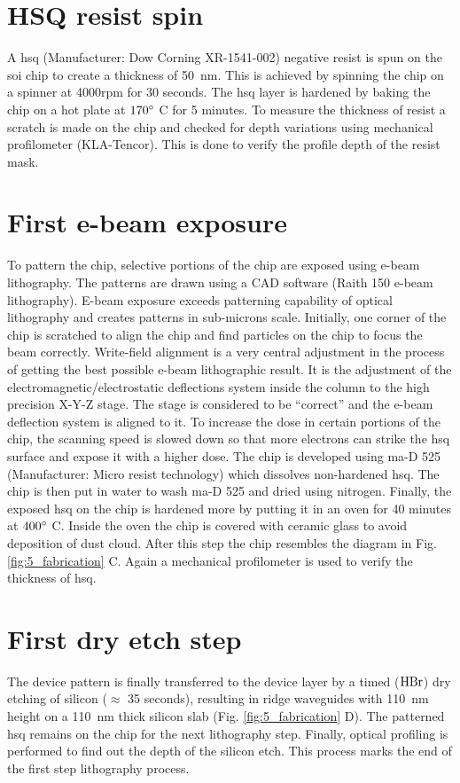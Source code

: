 \documentclass[../report.tex]{subfiles}
\begin{document}
\section{HSQ resist spin}
A \gls{hsq} (Manufacturer: Dow Corning XR-1541-002) negative resist is spun on the \gls{soi} chip to create a thickness of \SI{50}{\nano \meter}. This is achieved by spinning the chip on a spinner at 4000rpm for 30 seconds. The \gls{hsq} layer is hardened by baking the chip on a hot plate at $\mathrm{170^{\circ}}$ C for 5 minutes. To measure the thickness of resist a scratch is made on the chip and checked for depth variations using mechanical profilometer (KLA-Tencor). This is done to verify the profile depth of the resist mask.

\section{First e-beam exposure}
To pattern the chip, selective portions of the chip are exposed using e-beam lithography. The patterns are drawn using a CAD software (Raith 150 e-beam lithography). E-beam exposure exceeds patterning capability of optical lithography and creates patterns in sub-microns scale. Initially, one corner of the chip is scratched to align the chip and find particles on the chip to focus the beam correctly. Write-field alignment is a very central adjustment in the process of getting the best possible e-beam lithographic result. It is the adjustment of the electromagnetic/electrostatic deflections system inside the column to the high precision X-Y-Z stage. The stage is considered to be ``correct'' and the e-beam deflection system is aligned to it. To increase the dose in certain portions of the chip, the scanning speed is slowed down so that more electrons can strike the \gls{hsq} surface and expose it with a higher dose. The chip is developed using ma-D 525 (Manufacturer: Micro resist technology) which dissolves non-hardened \gls{hsq}. The chip is then put in water to wash ma-D 525 and dried using nitrogen. Finally, the exposed \gls{hsq} on the chip is hardened more by putting it in an oven for 40 minutes at $\mathrm{400^{\circ}}$ C. Inside the oven the chip is covered with ceramic glass to avoid deposition of dust cloud. After this step the chip resembles the diagram in Fig. \ref{fig:5_fabrication} C. Again a mechanical profilometer is used to verify the thickness of \gls{hsq}.    

\section{First dry etch step}
The device pattern is finally transferred to the device layer by a timed ($\mathrm{HBr}$) dry etching of silicon ($\approx$ 35 seconds), resulting in ridge waveguides with \SI{110}{\nano \meter} height on a \SI{110}{\nano \meter} thick silicon slab (Fig. \ref{fig:5_fabrication} D). The patterned \gls{hsq} remains on the chip for the next lithography step. Finally, optical profiling is performed to find out the depth of the silicon etch. This process marks the end of the first step lithography process.
\end{document}
